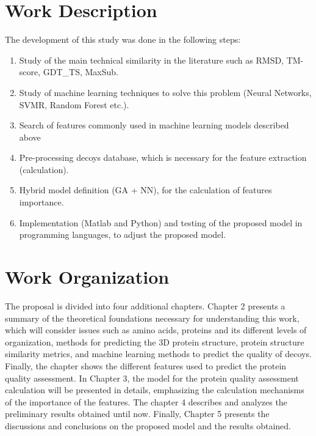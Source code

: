 \section{Work Description}
The development of this study was done in the following steps:
\begin{enumerate}[label=(\roman{*})]
	\item Study of the main technical similarity in the literature such as RMSD, TM-score, GDT\_TS, MaxSub.
	\item Study of machine learning techniques to solve this problem (Neural Networks, SVMR, Random Forest etc.). 
	\item Search of features commonly used in machine learning models described above
	\item Pre-processing decoys database, which is necessary for the feature extraction (calculation). 
	\item Hybrid model definition (GA + NN), for the calculation of features importance.
	\item Implementation (Matlab and Python) and testing of the proposed model in programming languages, to adjust the proposed model.
\end{enumerate}

\section{Work Organization}

The proposal is divided into four additional chapters. Chapter 2 presents a summary of the theoretical foundations necessary for understanding this work, which will consider issues such as amino acids, proteins and its different levels of organization, methods for predicting the 3D protein structure, protein structure similarity metrics, and machine learning methods to predict the quality of decoys. Finally, the chapter shows the different features used to predict the protein quality assessment. In Chapter 3, the model for the protein quality assessment calculation will be presented in details, emphasizing the calculation mechanisms of the importance of the features. The chapter 4 describes and analyzes the preliminary results obtained until now. Finally, Chapter 5 presents the discussions and conclusions on the proposed model and the results obtained. 
